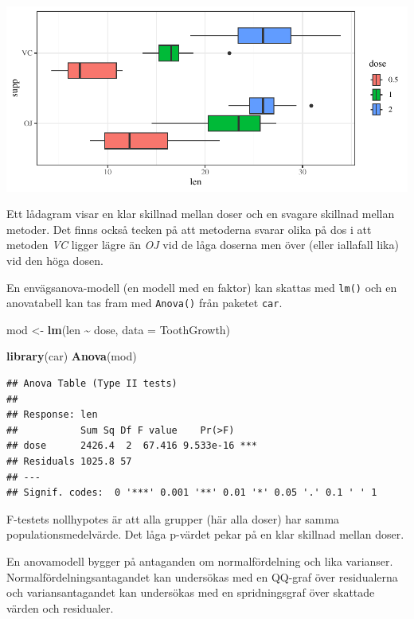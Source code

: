 \documentclass[
]{book}
\newenvironment{Shaded}{\begin{snugshade}}{\end{snugshade}}
\newcommand{\AttributeTok}[1]{\textcolor[rgb]{0.13,0.29,0.53}{#1}}
\newcommand{\FunctionTok}[1]{\textcolor[rgb]{0.13,0.29,0.53}{\textbf{#1}}}
\newcommand{\NormalTok}[1]{#1}
\newcommand{\OtherTok}[1]{\textcolor[rgb]{0.56,0.35,0.01}{#1}}
\newcommand{\SpecialCharTok}[1]{\textcolor[rgb]{0.81,0.36,0.00}{\textbf{#1}}}
\theoremstyle{definition}
\theoremstyle{definition}
\theoremstyle{definition}
\theoremstyle{definition}
\theoremstyle{remark}
\begin{document}
\begin{center}\includegraphics{R-anvisningar_files/figure-latex/unnamed-chunk-260-1} \end{center}

Ett lådagram visar en klar skillnad mellan doser och en svagare skillnad mellan metoder. Det finns också tecken på att metoderna svarar olika på dos i att metoden \emph{VC} ligger lägre än \emph{OJ} vid de låga doserna men över (eller iallafall lika) vid den höga dosen.

En envägsanova-modell (en modell med en faktor) kan skattas med \texttt{lm()} och en anovatabell kan tas fram med \texttt{Anova()} från paketet \texttt{car}.

\begin{Shaded}
\begin{Highlighting}[]
\NormalTok{mod }\OtherTok{\textless{}{-}} \FunctionTok{lm}\NormalTok{(len }\SpecialCharTok{\textasciitilde{}}\NormalTok{ dose, }\AttributeTok{data =}\NormalTok{ ToothGrowth)}

\FunctionTok{library}\NormalTok{(car)}
\FunctionTok{Anova}\NormalTok{(mod)}
\end{Highlighting}
\end{Shaded}

\begin{verbatim}
## Anova Table (Type II tests)
## 
## Response: len
##           Sum Sq Df F value    Pr(>F)    
## dose      2426.4  2  67.416 9.533e-16 ***
## Residuals 1025.8 57                      
## ---
## Signif. codes:  0 '***' 0.001 '**' 0.01 '*' 0.05 '.' 0.1 ' ' 1
\end{verbatim}

F-testets nollhypotes är att alla grupper (här alla doser) har samma populationsmedelvärde. Det låga p-värdet pekar på en klar skillnad mellan doser.

En anovamodell bygger på antaganden om normalfördelning och lika varianser. Normalfördelningsantagandet kan undersökas med en QQ-graf över residualerna och variansantagandet kan undersökas med en spridningsgraf över skattade värden och residualer.
\end{document}
